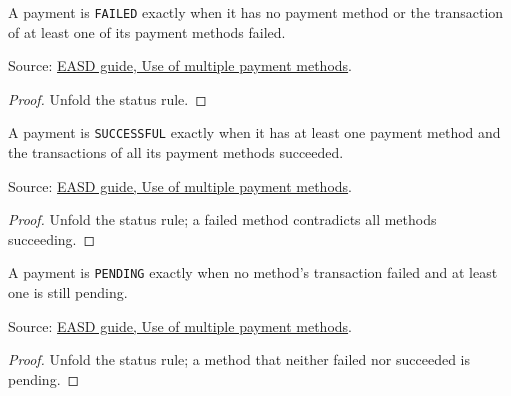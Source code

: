 \begin{theorem}
  \label{thm:payment-status-failed}
  A payment is \texttt{FAILED} exactly when it has no payment method or the
  transaction of at least one of its payment methods failed.

  Source: \href{https://standards.atlassian.net/wiki/spaces/EASD/pages/2592899087/Use+of+multiple+payment+methods+to+pay+for+a+single+item}{EASD guide, Use of multiple payment methods}.
\end{theorem}
\begin{proof}
  Unfold the status rule.
\end{proof}

\begin{theorem}
  \label{thm:payment-status-successful}
  A payment is \texttt{SUCCESSFUL} exactly when it has at least one payment
  method and the transactions of all its payment methods succeeded.

  Source: \href{https://standards.atlassian.net/wiki/spaces/EASD/pages/2592899087/Use+of+multiple+payment+methods+to+pay+for+a+single+item}{EASD guide, Use of multiple payment methods}.
\end{theorem}
\begin{proof}
  Unfold the status rule; a failed method contradicts all methods succeeding.
\end{proof}

\begin{theorem}
  \label{thm:payment-status-pending}
  A payment is \texttt{PENDING} exactly when no method's transaction failed
  and at least one is still pending.

  Source: \href{https://standards.atlassian.net/wiki/spaces/EASD/pages/2592899087/Use+of+multiple+payment+methods+to+pay+for+a+single+item}{EASD guide, Use of multiple payment methods}.
\end{theorem}
\begin{proof}
  Unfold the status rule; a method that neither failed nor succeeded is
  pending.
\end{proof}

